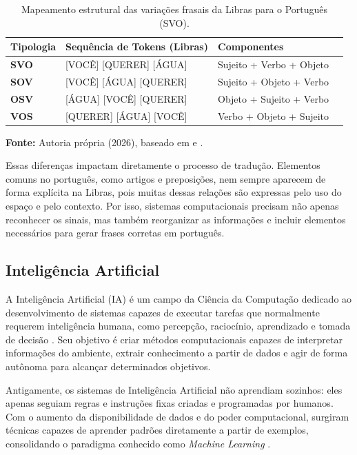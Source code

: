 \documentclass[
    12pt,                %
    openright,           %
    oneside,             %
    a4paper,             %
    english,             %
    brazil               %
]{abntex2}
\begin{document}
\begin{table}[H]
\centering
\caption{Mapeamento estrutural das variações frasais da Libras para o Português (SVO).}
\label{tab:variacoes_libras}
\small
\begin{tabularx}{\textwidth}{lXll}
\hline
\textbf{Tipologia} & \textbf{Sequência de Tokens (Libras)} & \textbf{Componentes}  \\ \hline
\textbf{SVO}       & [VOCÊ] [QUERER] [ÁGUA]                & Sujeito + Verbo + Objeto           \\
\textbf{SOV}       & [VOCÊ] [ÁGUA] [QUERER]                & Sujeito + Objeto + Verbo            \\
\textbf{OSV}       & [ÁGUA] [VOCÊ] [QUERER]                & Objeto + Sujeito + Verbo           \\
\textbf{VOS}       & [QUERER] [ÁGUA] [VOCÊ]                & Verbo + Objeto + Sujeito            \\ \hline
\end{tabularx}
\noindent\footnotesize{\newline \textbf{Fonte:} Autoria própria (2026), baseado em  e .}
\end{table}

Essas diferenças impactam diretamente o processo de tradução. Elementos comuns no português, como artigos e preposições, nem sempre aparecem de forma explícita na Libras, pois muitas dessas relações são expressas pelo uso do espaço e pelo contexto. Por isso, sistemas computacionais precisam não apenas reconhecer os sinais, mas também reorganizar as informações e incluir elementos necessários para gerar frases corretas em português.


\subsection{Inteligência Artificial}

A Inteligência Artificial (IA) é um campo da Ciência da Computação dedicado ao desenvolvimento de sistemas capazes de executar tarefas que normalmente requerem inteligência humana, como percepção, raciocínio, aprendizado e tomada de decisão \cite{russell2021}. Seu objetivo é criar métodos computacionais capazes de interpretar informações do ambiente, extrair conhecimento a partir de dados e agir de forma autônoma para alcançar determinados objetivos.

Antigamente, os sistemas de Inteligência Artificial não aprendiam sozinhos: eles apenas seguiam regras e instruções fixas criadas e programadas por humanos. Com o aumento da disponibilidade de dados e do poder computacional, surgiram técnicas capazes de aprender padrões diretamente a partir de exemplos, consolidando o paradigma conhecido como \textit{Machine Learning} \cite{ibm_ml2026}.
\end{document}
